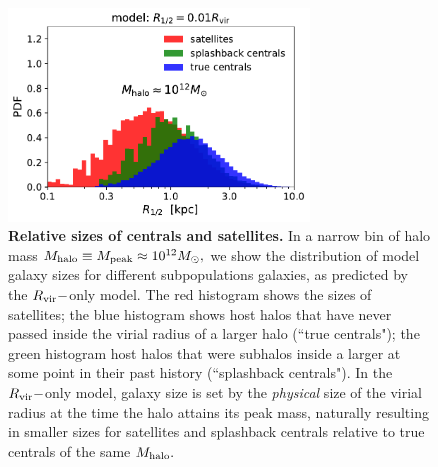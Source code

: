 \documentclass[usenatbib,usegraphicx,letterpaper]{mn2e}
\newcommand{\mpeak}{M_{\rm peak}}
\newcommand{\mhalo}{M_{\rm halo}}
\newcommand{\rvir}{R_{\rm vir}}
\newcommand{\msun}{M_\odot}
\begin{document}
\begin{figure}
\centering
\includegraphics[width=8cm]{FIGS/rvir_only_cen_sat_sizes.pdf}
\caption{
{\bf Relative sizes of centrals and satellites.} 
In a narrow bin of halo mass $\mhalo\equiv\mpeak\approx10^{12}\msun,$ we show the distribution of model galaxy sizes for different subpopulations galaxies, as predicted by the $\rvir-$only model. The red histogram shows the sizes of satellites; the blue histogram shows host halos that have never passed inside the virial radius of a larger halo (``true centrals"); the green histogram host halos that were subhalos inside a larger at some point in their past history (``splashback centrals"). In the $\rvir-$only model, galaxy size is set by the {\em physical} size of the virial radius at the time the halo attains its peak mass, naturally resulting in smaller sizes for satellites and splashback centrals relative to true centrals of the same $\mhalo.$ 
}
\label{fig:censatsizehist}
\end{figure}
\end{document}
